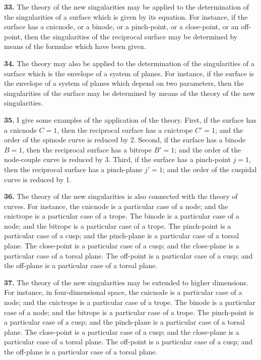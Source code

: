 \documentclass[11pt,a4paper]{article}
\begin{document}
\textbf{33.} The theory of the new singularities may be applied to the determination of the singularities of a surface which is given by its equation. For instance, if the surface has a cnicnode, or a binode, or a pinch-point, or a close-point, or an off-point, then the singularities of the reciprocal surface may be determined by means of the formulae which have been given.

\textbf{34.} The theory may also be applied to the determination of the singularities of a surface which is the envelope of a system of planes. For instance, if the surface is the envelope of a system of planes which depend on two parameters, then the singularities of the surface may be determined by means of the theory of the new singularities.

\textbf{35.} I give some examples of the application of the theory. First, if the surface has a cnicnode $C=1$, then the reciprocal surface has a cnictrope $C'=1$; and the order of the spinode curve is reduced by 2. Second, if the surface has a binode $B=1$, then the reciprocal surface has a bitrope $B'=1$; and the order of the node-couple curve is reduced by 3. Third, if the surface has a pinch-point $j=1$, then the reciprocal surface has a pinch-plane $j'=1$; and the order of the cuspidal curve is reduced by 1.

\textbf{36.} The theory of the new singularities is also connected with the theory of curves. For instance, the cnicnode is a particular case of a node; and the cnictrope is a particular case of a trope. The binode is a particular case of a node; and the bitrope is a particular case of a trope. The pinch-point is a particular case of a cusp; and the pinch-plane is a particular case of a torsal plane. The close-point is a particular case of a cusp; and the close-plane is a particular case of a torsal plane. The off-point is a particular case of a cusp; and the off-plane is a particular case of a torsal plane.

\textbf{37.} The theory of the new singularities may be extended to higher dimensions. For instance, in four-dimensional space, the cnicnode is a particular case of a node; and the cnictrope is a particular case of a trope. The binode is a particular case of a node; and the bitrope is a particular case of a trope. The pinch-point is a particular case of a cusp; and the pinch-plane is a particular case of a torsal plane. The close-point is a particular case of a cusp; and the close-plane is a particular case of a torsal plane. The off-point is a particular case of a cusp; and the off-plane is a particular case of a torsal plane.
\end{document}
